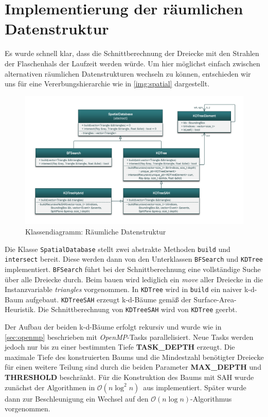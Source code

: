 \section{Implementierung der räumlichen Datenstruktur}\label{sec:spatial}
Es wurde schnell klar, dass die Schnittberechnung der Dreiecke mit den Strahlen der Flaschenhals der Laufzeit werden würde. Um hier möglichst einfach zwischen alternativen räumlichen Datenstrukturen wechseln zu können, entschieden wir uns für eine Vererbungshierarchie wie in \autoref{img:spatial} dargestellt.

\begin{figure}[htbp]
	\centering
	\includegraphics[width=1\textwidth]{graphics/spatial.pdf}
	\caption{Klassendiagramm: Räumliche Datenstruktur}
	\label{img:spatial}
\end{figure}

Die Klasse \texttt{SpatialDatabase} stellt zwei abstrakte Methoden \texttt{build} und \texttt{intersect} bereit. Diese werden dann von den Unterklassen \texttt{BFSearch} und \texttt{KDTree} implementiert. \texttt{BFSearch} führt bei der Schnittberechnung eine vollständige Suche über alle Dreiecke durch. Beim bauen wird lediglich ein \textit{move} aller Dreiecke in die Instanzvariable \textit{triangles} vorgenommen.
In \texttt{KDTree} wird in \texttt{build} ein naiver k-d-Baum aufgebaut. \texttt{KDTreeSAH} erzeugt k-d-Bäume gemäß der Surface-Area-Heuristik. Die Schnittberechnung von \texttt{KDTreeSAH} wird von  \texttt{KDTree} geerbt.

Der Aufbau der beiden k-d-Bäume erfolgt rekursiv und wurde wie in \autoref{sec:openmp} beschrieben mit \textit{OpenMP}-Tasks parallelisiert. Neue Tasks werden jedoch nur bis zu einer bestimmten Tiefe \textbf{TASK\_DEPTH} erzeugt. Die maximale Tiefe des konstruierten Baums und die Mindestzahl benötigter Dreiecke für einen weitere Teilung sind durch die beiden Parameter \textbf{MAX\_DEPTH} und \textbf{THRESHOLD} beschränkt.
Für die Konstruktion des Baums mit SAH wurde zunächst der Algorithmen in $\mathcal{O}(n\log^2{}n)$\ aus \cite{wald2006building} implementiert. Später wurde dann zur Beschleunigung ein Wechsel auf den $\mathcal{O}(n\log{}n)$-Algorithmus vorgenommen.

